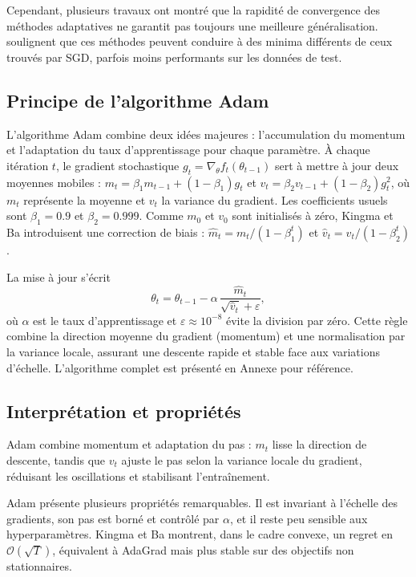 \documentclass[a4paper,12pt]{article}
\begin{document}
Cependant, plusieurs travaux ont montré que la rapidité de convergence des méthodes
adaptatives ne garantit pas toujours une meilleure généralisation. \cite{wilson2017}
soulignent que ces méthodes peuvent conduire à des minima différents de ceux trouvés par
SGD, parfois moins performants sur les données de test.

\subsection{Principe de l’algorithme Adam}

L’algorithme Adam combine deux idées
majeures : l’accumulation du momentum et l’adaptation du taux
d’apprentissage pour chaque paramètre. À chaque itération $t$, le gradient stochastique
$g_t = \nabla_\theta f_t(\theta_{t-1})$ sert à mettre à jour deux
moyennes mobiles :
$m_t = \beta_1 m_{t-1} + (1-\beta_1) g_t$ et
$v_t = \beta_2 v_{t-1} + (1-\beta_2) g_t^2$,
où $m_t$ représente la moyenne et $v_t$ la variance du gradient. Les coefficients usuels sont
$\beta_1=0.9$ et $\beta_2=0.999$. Comme $m_0$ et $v_0$ sont initialisés
à zéro, Kingma et Ba introduisent une correction de biais :
$\hat{m}_t = m_t/(1-\beta_1^t)$ et
$\hat{v}_t = v_t/(1-\beta_2^t)$.

La mise à jour s’écrit
\[
\theta_t = \theta_{t-1} - \alpha\,\frac{\hat{m}_t}{\sqrt{\hat{v}_t}+\varepsilon},
\]
où $\alpha$ est le taux d’apprentissage et $\varepsilon\approx10^{-8}$ évite la division par zéro.
Cette règle combine la direction moyenne du gradient (momentum) et une
normalisation par la variance locale, assurant une descente rapide et
stable face aux variations d’échelle.
L’algorithme complet est présenté en Annexe pour référence.


\subsection{Interprétation et propriétés}

Adam combine momentum et adaptation du pas : $m_t$ lisse la direction de
descente, tandis que $v_t$ ajuste le pas selon la variance locale du
gradient, réduisant les oscillations et stabilisant l’entraînement.

Adam présente plusieurs propriétés remarquables. Il est invariant à
l’échelle des gradients, son pas est borné et contrôlé par $\alpha$, et
il reste peu sensible aux hyperparamètres. Kingma et Ba montrent, dans
le cadre convexe, un regret en $\mathcal{O}(\sqrt{T})$, équivalent à
AdaGrad mais plus stable sur des objectifs non stationnaires.
\end{document}

